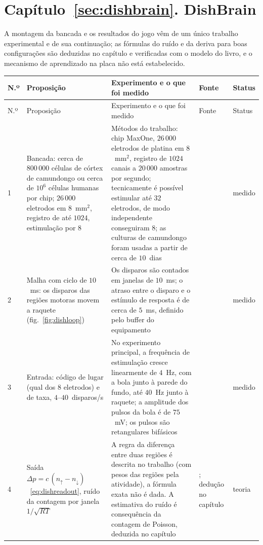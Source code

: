 \section{Capítulo~\ref{sec:dishbrain}. DishBrain}

A montagem da bancada e os resultados do jogo vêm de um único trabalho experimental e de sua continuação; as fórmulas do ruído e da deriva para boas configurações são deduzidas no capítulo e verificadas com o modelo do livro, e o mecanismo de aprendizado na placa não está estabelecido.

{\footnotesize
\setlength{\tabcolsep}{3pt}\renewcommand{\arraystretch}{1.15}
\begin{longtable}{>{\raggedright}p{0.5cm}>{\raggedright}p{4.0cm}>{\raggedright}p{5.6cm}>{\raggedright}p{2.3cm}>{\raggedright\arraybackslash}p{1.7cm}}
\toprule
N.º & Proposição & Experimento e o que foi medido & Fonte & Status \\
\midrule\endfirsthead
\toprule
N.º & Proposição & Experimento e o que foi medido & Fonte & Status \\
\midrule\endhead
1 & Bancada: cerca de $800\,000$ células de córtex de camundongo ou cerca de $10^6$ células humanas por chip; $26\,000$ eletrodos em $8$~mm$^2$, registro de até $1024$, estimulação por $8$ & Métodos do trabalho: chip MaxOne, $26\,000$ eletrodos de platina em $8$~mm$^2$, registro de $1024$ canais a $20\,000$ amostras por segundo; tecnicamente é possível estimular até $32$ eletrodos, de modo independente conseguiram $8$; as culturas de camundongo foram usadas a partir de cerca de $10$~dias & \cite{Kagan2022} & medido \\
2 & Malha com ciclo de $10$~ms: os disparos das regiões motoras movem a raquete (fig.~\ref{fig:dishloop}) & Os disparos são contados em janelas de $10$~ms; o atraso entre o disparo e o estímulo de resposta é de cerca de $5$~ms, definido pelo buffer do equipamento & \cite{Kagan2022} & medido \\
3 & Entrada: código de lugar (qual dos $8$ eletrodos) e de taxa, $4$--$40$~disparos/s & No experimento principal, a frequência de estimulação cresce linearmente de $4$~Hz, com a bola junto à parede do fundo, até $40$~Hz junto à raquete; a amplitude dos pulsos da bola é de $75$~mV; os pulsos são retangulares bifásicos & \cite{Kagan2022} & medido \\
4 & Saída $\Delta p=c\,(n_\uparrow-n_\downarrow)$~\eqref{eq:dishreadout}, ruído da contagem por janela $1/\sqrt{RT}$ & A regra da diferença entre duas regiões é descrita no trabalho (com pesos das regiões pela atividade), a fórmula exata não é dada. A estimativa do ruído é consequência da contagem de Poisson, deduzida no capítulo & \cite{Kagan2022}; dedução no capítulo & teoria \\

\end{longtable}}
